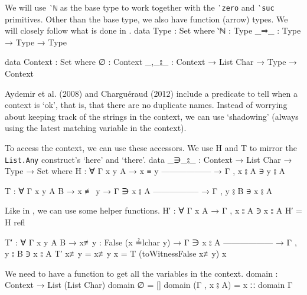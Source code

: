 \documentclass[logo,bsc,singlespacing,parskip,online]{infthesis}
\renewenvironment{code}{\mintedcopy[breaklines,breaksymbolleft=\;]{agda}}{\endmintedcopy}
\begin{document}
We will use \texttt{‵ℕ} as the base type to work together with the \texttt{‵zero} and \texttt{‵suc}
primitives. Other than the base type, we also have function (arrow) types. We will closely follow
what is done in \citet{wadler_programming_2022}.
\begin{code}
data Type : Set where
  ‵ℕ : Type
  _⇒_ : Type → Type → Type

data Context : Set where
  ∅ : Context
  _,_⦂_ : Context → List Char → Type → Context
\end{code}

Aydemir et al. (2008) and Charguéraud (2012) include a predicate to tell when a context is `ok',
that is, that there are no duplicate names. Instead of worrying about keeping track of the strings
in the context, we can use `shadowing' (always using the latest matching variable in the context).

To access the context, we can use these accessors. We use H and T to mirror the \texttt{List.Any}
construct's `here' and `there'.
\begin{code}
data _∋_⦂_ : Context → List Char → Type → Set where
  H : ∀ {Γ x y A}
    → x ≡ y
      ------------------
    → Γ , x ⦂ A ∋ y ⦂ A

  T : ∀ {Γ x y A B}
    → x ≢ y
    → Γ ∋ x ⦂ A
      -----------------
    → Γ , y ⦂ B ∋ x ⦂ A
\end{code}

Like in \citet{wadler_programming_2022}, we can use some helper functions.
\begin{code}
H′ : ∀ {Γ x A}
  → Γ , x ⦂ A ∋ x ⦂ A
H′ = H refl

T′ : ∀ {Γ x y A B}
   → {x≢y : False (x ≟lchar y)}
   → Γ ∋ x ⦂ A
     ------------------
   → Γ , y ⦂ B ∋ x ⦂ A
T′ {x≢y = x≢y} x = T (toWitnessFalse x≢y) x
\end{code}

We need to have a function to get all the variables in the context.
\begin{code}
domain : Context → List (List Char)
domain ∅ = []
domain (Γ , x ⦂ A) = x ∷ domain Γ
\end{code}
\end{document}
